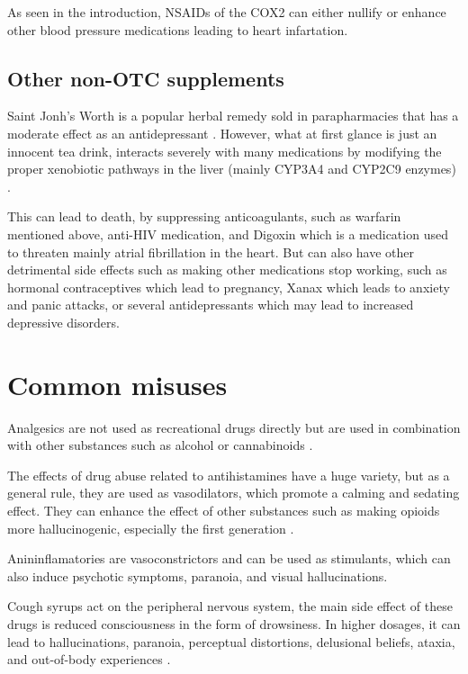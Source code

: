  As seen in the introduction, NSAIDs of the COX2 can either nullify or enhance other blood pressure medications leading to heart infartation.

\subsection{Other non-OTC supplements}

Saint Jonh's Worth is a popular herbal remedy sold in parapharmacies that has a moderate effect as an antidepressant \cite{Linde2008}. However, what at first glance is just an innocent tea drink, interacts severely with many medications by modifying the proper xenobiotic pathways in the liver (mainly CYP3A4 and CYP2C9 enzymes) \cite{Komoroski2004}.

This can lead to death, by suppressing anticoagulants, such as warfarin mentioned above, anti-HIV medication, and Digoxin which is a medication used to threaten mainly atrial fibrillation in the heart. But can also have other detrimental side effects such as making other medications stop working, such as hormonal contraceptives which lead to pregnancy, Xanax which leads to anxiety and panic attacks, or several antidepressants which may lead to increased depressive disorders.

\section{Common misuses}

Analgesics are not used as recreational drugs directly but are used in combination with other substances such as alcohol or cannabinoids \cite{otcAbuse2020}.

The effects of drug abuse related to antihistamines have a huge variety, but as a general rule, they are used as vasodilators, which promote a calming and sedating effect. They can enhance the effect of other substances such as making opioids more hallucinogenic, especially the first generation \cite{otcAbuse2020}.

Anininflamatories are vasoconstrictors and can be used as stimulants, which can also induce psychotic symptoms, paranoia, and visual hallucinations. \cite{otcAbuse2020}

Cough syrups act on the peripheral nervous system, the main side effect of these drugs is reduced consciousness in the form of drowsiness. In higher dosages, it can lead to hallucinations, paranoia, perceptual distortions, delusional beliefs, ataxia, and out-of-body experiences \cite{otcAbuse2020}.

